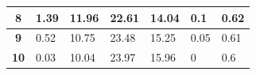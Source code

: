 \documentclass[UTF8]{ctexbeamer}
\numberwithin{equation}{section}  %
\begin{document}
\begin{frame}
\begin{table}[htbp]
\begin{tabular}{cllllll}
        \midrule
\textbf{8}    & 1.39                               & 11.96                              & 22.61                              & 14.04                              & 0.1                                & 0.62                               \\
        \midrule
\textbf{9}    & 0.52                               & 10.75                              & 23.48                              & 15.25                              & 0.05                               & 0.61                               \\
        \midrule
\textbf{10}   & 0.03                               & 10.04                              & 23.97                              & 15.96                              & 0                                  & 0.6                               \\
        \bottomrule
\end{tabular}
\end{table}


\end{frame}
\end{document}

